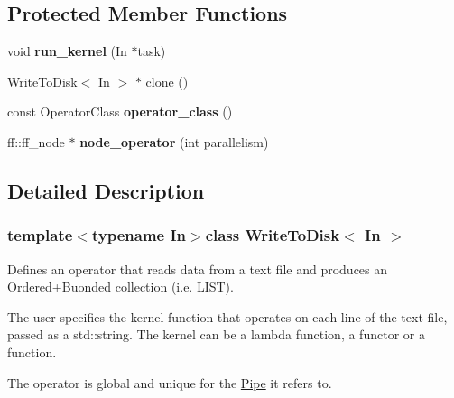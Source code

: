 \subsection*{\-Protected \-Member \-Functions}
\begin{DoxyCompactItemize}
\item 
\hypertarget{class_write_to_disk_a9b5fc69a20e3a5d95d8522711f263104}{void {\bfseries run\-\_\-kernel} (\-In $\ast$task)}\label{class_write_to_disk_a9b5fc69a20e3a5d95d8522711f263104}

\item 
\hyperlink{class_write_to_disk}{\-Write\-To\-Disk}$<$ \-In $>$ $\ast$ \hyperlink{class_write_to_disk_a0f070d389c1624810e727f648e0fc8fd}{clone} ()
\item 
\hypertarget{class_write_to_disk_a5a4d3a2a0018e52510389b7d630ed794}{const \-Operator\-Class {\bfseries operator\-\_\-class} ()}\label{class_write_to_disk_a5a4d3a2a0018e52510389b7d630ed794}

\item 
\hypertarget{class_write_to_disk_a3f1c3d0610a1a08f485c9b7c561de41f}{ff\-::ff\-\_\-node $\ast$ {\bfseries node\-\_\-operator} (int parallelism)}\label{class_write_to_disk_a3f1c3d0610a1a08f485c9b7c561de41f}

\end{DoxyCompactItemize}


\subsection{\-Detailed \-Description}
\subsubsection*{template$<$typename \-In$>$class Write\-To\-Disk$<$ In $>$}

\-Defines an operator that reads data from a text file and produces an \-Ordered+\-Buonded collection (i.\-e. \-L\-I\-S\-T).

\-The user specifies the kernel function that operates on each line of the text file, passed as a std\-::string. \-The kernel can be a lambda function, a functor or a function.

\-The operator is global and unique for the \hyperlink{class_pipe}{\-Pipe} it refers to. 

